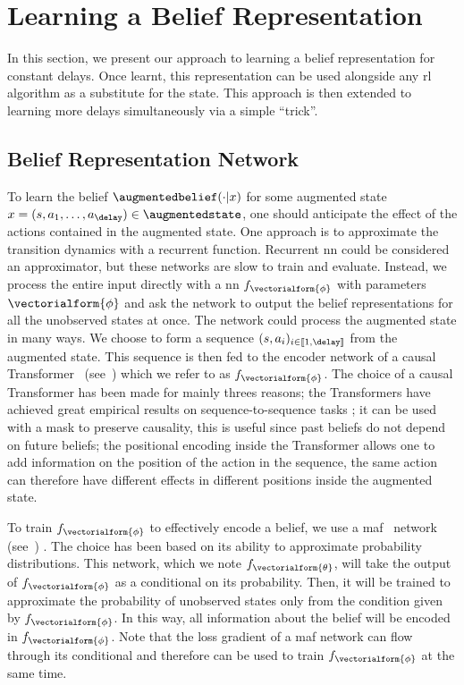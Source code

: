 \section{Learning a Belief Representation}

In this section, we present our approach to learning a belief representation for constant delays. 
Once learnt, this representation can be used alongside any \gls{rl} algorithm as a substitute for the state.
This approach is then extended to learning more delays simultaneously via a simple ``trick''. 

\subsection{Belief Representation Network}
\label{subsec:belief_net}

To learn the belief $\augmentedbelief(\cdot\vert x)$ for some augmented state $x=(s,a_1,\dots,a_{\delay})\in\augmentedstate$, one should anticipate the effect of the actions contained in the augmented state.
One approach is to approximate the transition dynamics with a recurrent function.
Recurrent \gls{nn} could be considered an approximator, but these networks are slow to train and evaluate.
Instead, we process the entire input directly with a \gls{nn} $f_{\vectorialform{\phi}}$ with parameters $\vectorialform{\phi}$ and ask the network to output the belief representations for all the unobserved states at once.
The network could process the augmented state in many ways.
We choose to form a sequence $(s,a_{i})_{i \in [\![1,\delay]\!]}$ from the augmented state.
This sequence is then fed to the encoder network of a causal Transformer~\cite{vaswani2017attention} (see~) which we refer to as $f_{\vectorialform{\phi}}$. 
The choice of a causal Transformer has been made for mainly threes reasons; the Transformers have achieved great empirical results on sequence-to-sequence tasks \cite{devlin2018bert}; it can be used with a mask to preserve causality, this is useful since past beliefs do not depend on future beliefs; the positional encoding inside the Transformer allows one to add information on the position of the action in the sequence, the same action can therefore have different effects in different positions inside the augmented state. 

To train $f_{\vectorialform{\phi}}$ to effectively encode a belief, we use a \gls{maf}~\cite{papamakarios2017masked} network (see~) .
The choice has been based on its ability to approximate probability distributions.
This network, which we note $f_{\vectorialform{\theta}}$, will take the output of $f_{\vectorialform{\phi}}$ as a conditional on its probability. 
Then, it will be trained to approximate the probability of unobserved states only from the condition given by $f_{\vectorialform{\phi}}$. 
In this way, all information about the belief will be encoded in $f_{\vectorialform{\phi}}$.
Note that the loss gradient of a \gls{maf} network can flow through its conditional and therefore can be used to train $f_{\vectorialform{\phi}}$ at the same time.

